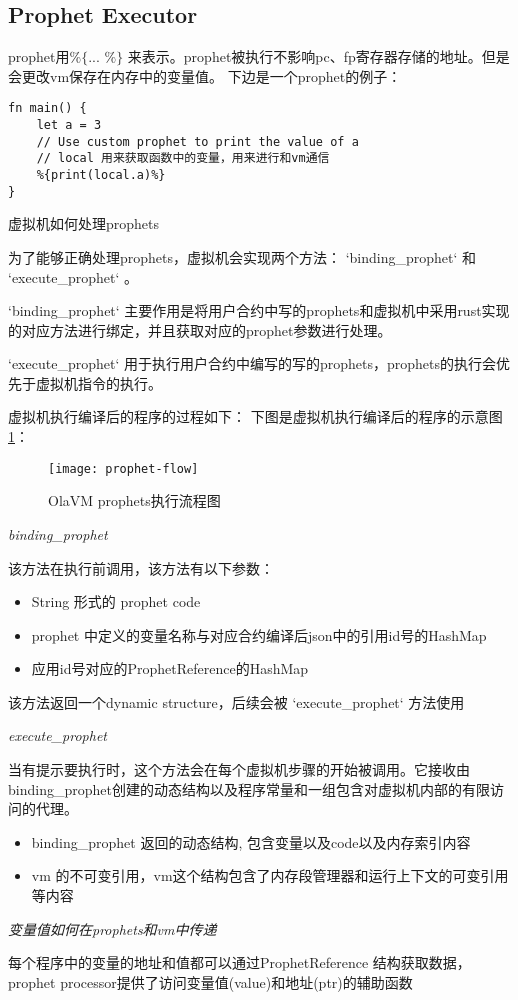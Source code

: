 \subsection{Prophet Executor}\label{subsec: processor-prophet-executor}
prophet用$\texttt{\%\{ ... \%\}}$ 来表示。prophet被执行不影响pc、fp寄存器存储的地址。但是会更改vm保存在内存中的变量值。
下边是一个prophet的例子：
\begin{lstlisting}[label={lst:prophet-demo}]
fn main() {
    let a = 3
    // Use custom prophet to print the value of a
    // local 用来获取函数中的变量，用来进行和vm通信
    %{print(local.a)%}
}
\end{lstlisting}

虚拟机如何处理prophets

为了能够正确处理prophets，虚拟机会实现两个方法： `binding\_prophet` 和 `execute\_prophet` 。

`binding\_prophet` 主要作用是将用户合约中写的prophets和虚拟机中采用rust实现的对应方法进行绑定，并且获取对应的prophet参数进行处理。

`execute\_prophet` 用于执行用户合约中编写的写的prophets，prophets的执行会优先于虚拟机指令的执行。

虚拟机执行编译后的程序的过程如下：
下图是虚拟机执行编译后的程序的示意图\ref{fig: prophet-flow}：
\begin{figure}[!htp]
    \centering
    \texttt{[image: prophet-flow]}
    \caption{OlaVM prophets执行流程图}
    \label{fig: prophet-flow}
\end{figure}

\emph{binding\_prophet}

该方法在执行前调用，该方法有以下参数：

\begin{itemize}
    \item String 形式的  prophet code
    \item prophet 中定义的变量名称与对应合约编译后json中的引用id号的HashMap
    \item 应用id号对应的ProphetReference的HashMap
\end{itemize}

该方法返回一个dynamic structure，后续会被 `execute\_prophet` 方法使用

\emph{execute\_prophet}

当有提示要执行时，这个方法会在每个虚拟机步骤的开始被调用。它接收由binding\_prophet创建的动态结构以及程序常量和一组包含对虚拟机内部的有限访问的代理。

\begin{itemize}
    \item binding\_prophet 返回的动态结构, 包含变量以及code以及内存索引内容
    \item vm 的不可变引用，vm这个结构包含了内存段管理器和运行上下文的可变引用等内容
\end{itemize}

\emph{变量值如何在prophets和vm中传递}

每个程序中的变量的地址和值都可以通过ProphetReference 结构获取数据，prophet processor提供了访问变量值(value)和地址(ptr)的辅助函数